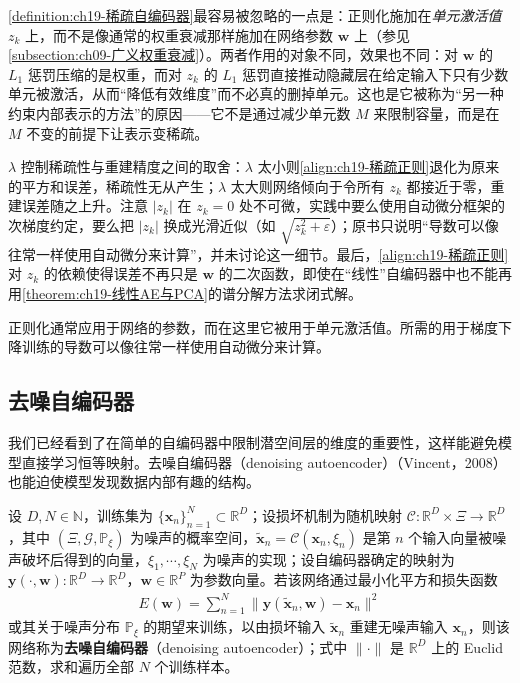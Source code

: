 \documentclass[../../main.tex]{subfiles}
\begin{document}
\begin{remark}
\cref{definition:ch19-稀疏自编码器}最容易被忽略的一点是：正则化施加在\emph{单元激活值} $z_k$ 上，而不是像通常的权重衰减那样施加在网络参数 $\bm{w}$ 上（参见\cref{subsection:ch09-广义权重衰减}）。两者作用的对象不同，效果也不同：对 $\bm{w}$ 的 $L_1$ 惩罚压缩的是权重，而对 $z_k$ 的 $L_1$ 惩罚直接推动隐藏层在给定输入下只有少数单元被激活，从而“降低有效维度”而不必真的删掉单元。这也是它被称为“另一种约束内部表示的方法”的原因——它不是通过减少单元数 $M$ 来限制容量，而是在 $M$ 不变的前提下让表示变稀疏。

$\lambda$ 控制稀疏性与重建精度之间的取舍：$\lambda$ 太小则\eqref{align:ch19-稀疏正则}退化为原来的平方和误差，稀疏性无从产生；$\lambda$ 太大则网络倾向于令所有 $z_k$ 都接近于零，重建误差随之上升。注意 $|z_k|$ 在 $z_k=0$ 处不可微，实践中要么使用自动微分框架的次梯度约定，要么把 $|z_k|$ 换成光滑近似（如 $\sqrt{z_k^{2}+\varepsilon}$）；原书只说明“导数可以像往常一样使用自动微分来计算”，并未讨论这一细节。最后，\eqref{align:ch19-稀疏正则}对 $z_k$ 的依赖使得误差不再只是 $\bm{w}$ 的二次函数，即使在“线性”自编码器中也不能再用\cref{theorem:ch19-线性AE与PCA}的谱分解方法求闭式解。
\end{remark}

正则化通常应用于网络的参数，而在这里它被用于单元激活值。所需的用于梯度下降训练的导数可以像往常一样使用自动微分来计算。

\subsection{去噪自编码器}\label{subsection:ch19-去噪自编码器}

我们已经看到了在简单的自编码器中限制潜空间层的维度的重要性，这样能避免模型直接学习恒等映射。去噪自编码器（denoising autoencoder）（Vincent，2008）也能迫使模型发现数据内部有趣的结构。

\begin{definition}[去噪自编码器]\label{definition:ch19-去噪自编码器}
设 $D,N\in\mathbb{N}$，训练集为 $\{\bm{x}_{n}\}_{n=1}^{N}\subset\mathbb{R}^{D}$；设损坏机制为随机映射 $\mathcal{C}:\mathbb{R}^{D}\times\Xi\to\mathbb{R}^{D}$，其中 $(\Xi,\mathcal{G},\mathbb{P}_{\xi})$ 为噪声的概率空间，$\tilde{\bm{x}}_{n}=\mathcal{C}(\bm{x}_{n},\xi_{n})$ 是第 $n$ 个输入向量被噪声破坏后得到的向量，$\xi_{1},\cdots,\xi_{N}$ 为噪声的实现；设自编码器确定的映射为 $\bm{y}(\cdot,\bm{w}):\mathbb{R}^{D}\to\mathbb{R}^{D}$，$\bm{w}\in\mathbb{R}^{P}$ 为参数向量。若该网络通过最小化平方和损失函数
\begin{align}
E(\bm{w})=\sum_{n=1}^{N}\big\|\bm{y}(\tilde{\bm{x}}_n,\bm{w})-\bm{x}_n\big\|^{2}
\label{align:ch19-去噪损失}
\end{align}
或其关于噪声分布 $\mathbb{P}_{\xi}$ 的期望来训练，以由损坏输入 $\tilde{\bm{x}}_{n}$ 重建无噪声输入 $\bm{x}_{n}$，则该网络称为\textbf{去噪自编码器}（denoising autoencoder）；式中 $\|\cdot\|$ 是 $\mathbb{R}^{D}$ 上的 Euclid 范数，求和遍历全部 $N$ 个训练样本。
\end{definition}
\end{document}
